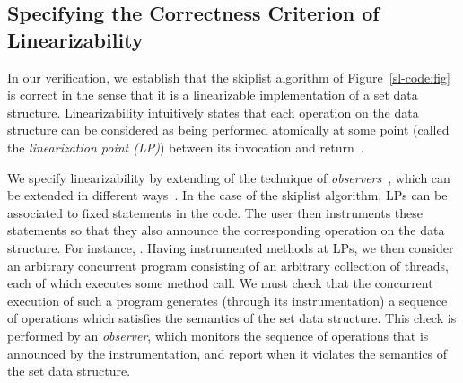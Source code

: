 \subsection{Specifying the Correctness Criterion of Linearizability}
In our verification, we establish that the skiplist algorithm of
Figure~\ref{sl-code:fig} is correct in the sense that it is a
linearizable implementation of a set data structure.
Linearizability intuitively states that
each operation on the data structure can be considered as being
performed atomically at some point (called the {\em linearization point (LP)})
between its invocation and return~\cite{HeWi:linearizability}.

We specify linearizability by extending of the technique of
{\em observers}~\cite{AHHR:integrated}, which can be extended in different
ways~\cite{BEEH:icalp15,HSV:concur13,Quy:sas16}.
In the case of the skiplist algorithm,
LPs can be associated to fixed statements in the code. The user then instruments
these statements so that they also announce the corresponding operation on
the data structure. For instance, .
Having instrumented methods at LPs, we
then consider an arbitrary concurrent program consisting of
an arbitrary collection of threads, each of which executes some method call.
We must check that the concurrent execution of such a program generates
(through its instrumentation) a sequence of operations which satisfies the
semantics of the set data structure. 
This check is performed by an {\em observer}, which 
monitors the sequence of operations that is announced by the
instrumentation, and report when it violates the semantics of the set
data structure.





